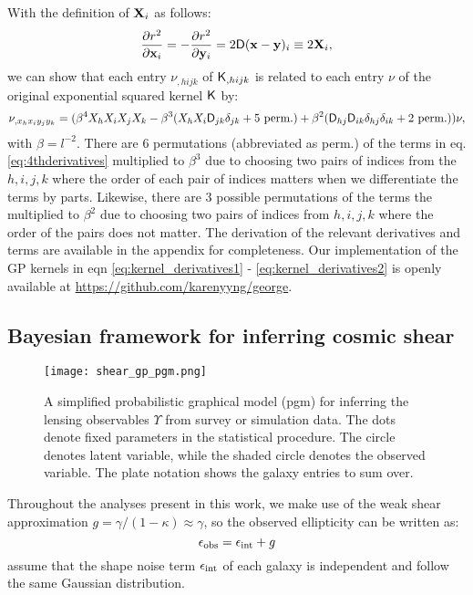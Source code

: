 With the definition of ${\bf X}_i$ as follows:
\begin{equation}
	\frac{\partial r^2}{\partial \mathbf{x}_i} = -\frac{\partial
	r^2}{\partial \mathbf{y}_i} =
	2 \mathsf{D}(\mathbf{x} - \mathbf{y})_i \equiv 2{\bf X}_i,
\end{equation}
we can show that each entry $\nu_{,hijk}$ of $\mathsf{K}_{,hijk}$ is
related to each entry $\nu$ of the original exponential squared kernel
$\mathsf{K}$ by:
\begin{equation}
\nu_{,x_h x_i y_j y_k} = (\beta^4 X_h X_i X_j X_k -
\beta^3 (X_h X_i \mathsf{D}_{jk} \delta_{jk} + 5~{\rm perm.}) + \beta^2
(\mathsf{D}_{hj} \mathsf{D}_{ik}\delta_{hj}\delta_{ik} + 2~{\rm perm.})) \nu,
\label{eq:4thderivatives}
\end{equation}
with $\beta = l^{-2}$. There are 6 permutations (abbreviated as perm.) of the terms in
eq. \ref{eq:4thderivatives}
multiplied to $\beta^3$ due
to choosing two pairs of indices from the $h,i,j,k$ where the order of each
pair of indices matters when we differentiate the terms by parts. 
Likewise, there are 3 possible permutations of
the terms the multiplied to $\beta^2$ due to choosing two pairs of indices from
$h, i, j, k$ where the order of the pairs does not matter.
The derivation of the relevant derivatives and terms are available 
in the appendix for completeness. 
Our implementation of the GP kernels in eqn \ref{eq:kernel_derivatives1} - 
\ref{eq:kernel_derivatives2} is openly available at
\href{https://github.com/karenyyng/george}{https://github.com/karenyyng/george}.


\subsection{Bayesian framework for inferring cosmic shear}
\begin{figure}
	\centering
	\texttt{[image: shear\_gp\_pgm.png]}
	\caption{A simplified probabilistic graphical model (pgm) for inferring
		the lensing observables $\Upsilon$ from survey or simulation data. The dots
		denote fixed parameters in the statistical procedure. The circle denotes
		latent variable, while the shaded circle denotes 
		the observed variable. The plate notation shows the galaxy entries to sum
		over.
		\label{fig:simplified_pgm}}
\end{figure}

Throughout the analyses present in this work, 
we make use of the weak shear approximation 
$g = \gamma / (1 - \kappa)  \approx \gamma$, so the observed ellipticity can be
written as: 
\begin{equation}
	\epsilon_{\rm obs} = \epsilon_{\rm int} + g 
\end{equation}
assume that the shape noise term $\epsilon_{\rm int}$ of each galaxy is 
independent and follow the same Gaussian distribution.  

